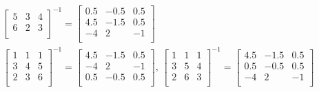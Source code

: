 \begin{enumerate}[\bfseries S1.]
\begin{equation*}
\begin{split}
\begin{bmatrix}
            5&     3&     4\\
            6&     2&     3\\
        \end{bmatrix}^{-1}=\begin{bmatrix}
            0.5&   -0.5&    0.5\\
            4.5&   -1.5&    0.5\\
             -4&    2  &    -1\\
        \end{bmatrix}\\
        \begin{bmatrix}
            1&     1&     1\\
            3&     4&     5\\
            2&     3&     6\\
        \end{bmatrix}^{-1}=\begin{bmatrix}
            4.5 &  -1.5&    0.5\\
            -4  &    2 &     -1\\
             0.5&  -0.5&    0.5\\
        \end{bmatrix},\,
        \begin{bmatrix}
            1&     1&     1\\
            3&     5&     4\\
            2&     6&     3\\
        \end{bmatrix}^{-1}=\begin{bmatrix}
            4.5&   -1.5&    0.5\\
            0.5&   -0.5&    0.5\\
           -4&    2&   -1\\
        \end{bmatrix}\\
    \end{split}
    \end{equation*}
\end{enumerate}
